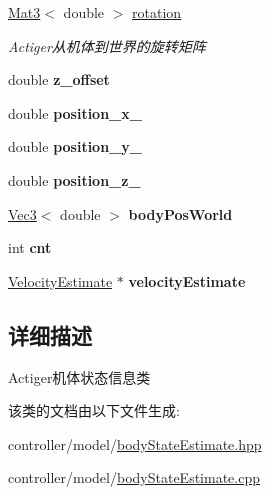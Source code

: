 \begin{DoxyCompactItemize}
\mbox{\label{classquadruped_1_1BodyStateEstimate_aefe6bd47e63f09418b59581b057fb59c}} 
\hyperlink{cppTypes_8h_adb7d462b35d31f0b2583b3e230a2a2c3}{Mat3}$<$ double $>$ \hyperlink{classquadruped_1_1BodyStateEstimate_aefe6bd47e63f09418b59581b057fb59c}{rotation}
\begin{DoxyCompactList}\small\item\em Actiger从机体到世界的旋转矩阵 \end{DoxyCompactList}\item 
\mbox{\label{classquadruped_1_1BodyStateEstimate_a2970e450281c6c3c292f374d0ba270dd}} 
double {\bfseries z\+\_\+offset}
\item 
\mbox{\label{classquadruped_1_1BodyStateEstimate_a33cb43c18bb3321dc8dd4ce73c806ad6}} 
double {\bfseries position\+\_\+x\+\_\+}
\item 
\mbox{\label{classquadruped_1_1BodyStateEstimate_ab9f2b9c71c9f7b534b88a5c32a822048}} 
double {\bfseries position\+\_\+y\+\_\+}
\item 
\mbox{\label{classquadruped_1_1BodyStateEstimate_a4dc9b7e4c4728fafb92b9b3542617b99}} 
double {\bfseries position\+\_\+z\+\_\+}
\item 
\mbox{\label{classquadruped_1_1BodyStateEstimate_a6ec290fad3636ce035b5f77cc8776cc6}} 
\hyperlink{cppTypes_8h_a65c27bf97693676535dd0b30ea0ad399}{Vec3}$<$ double $>$ {\bfseries body\+Pos\+World}
\item 
\mbox{\label{classquadruped_1_1BodyStateEstimate_a5e504f77a67dad88923a1c366227437b}} 
int {\bfseries cnt}
\item 
\mbox{\label{classquadruped_1_1BodyStateEstimate_a81bd0b9aa8dce20696856eefb5431b1c}} 
\hyperlink{classVelocityEstimate}{Velocity\+Estimate} $\ast$ {\bfseries velocity\+Estimate}
\end{DoxyCompactItemize}


\subsection{详细描述}
Actiger机体状态信息类 

该类的文档由以下文件生成\+:\begin{DoxyCompactItemize}
\item 
controller/model/\hyperlink{bodyStateEstimate_8hpp}{body\+State\+Estimate.\+hpp}\item 
controller/model/\hyperlink{bodyStateEstimate_8cpp}{body\+State\+Estimate.\+cpp}\end{DoxyCompactItemize}
